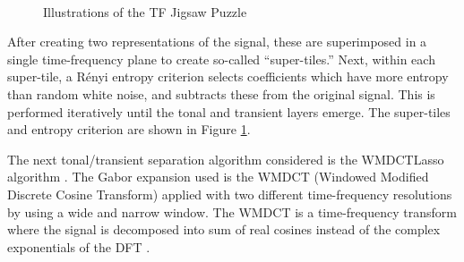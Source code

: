 \documentclass[report.tex]{subfiles}
\begin{document}
\begin{figure}[ht]
	\centering
	\\
	\caption{Illustrations of the TF Jigsaw Puzzle \parencite[3, 4]{tfjigsaw}}
	\label{fig:supertiles}
\end{figure}

After creating two representations of the signal, these are superimposed in a single time-frequency plane to create so-called ``super-tiles.'' Next, within each super-tile, a R{\'e}nyi entropy criterion selects coefficients which have more entropy than random white noise, and subtracts these from the original signal. This is performed iteratively until the tonal and transient layers emerge. The super-tiles and entropy criterion are shown in Figure \ref{fig:supertiles}.

The next tonal/transient separation algorithm considered is the WMDCTLasso algorithm \parencite{wmdct}. The Gabor expansion used is the WMDCT (Windowed Modified Discrete Cosine Transform) applied with two different time-frequency resolutions by using a wide and narrow window. The WMDCT is a time-frequency transform where the signal is decomposed into sum of real cosines instead of the complex exponentials of the DFT \parencite{mdct}.
\end{document}
